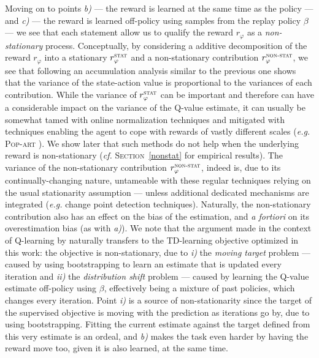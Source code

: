 Moving on to points \textit{b)}
--- the reward is learned at the same time as the policy ---
and \textit{c)}
--- the reward is learned off-policy using samples from the replay policy $\beta$ ---
we see that each statement allow us to qualify the reward $r_\varphi$ as
a \emph{non-stationary} process.
Conceptually, by considering a additive decomposition of the reward $r_\varphi$
into a stationary $r_\varphi^\textsc{stat}$
and a non-stationary contribution $r_\varphi^\textsc{non-stat}$,
we see that following an accumulation analysis similar to the previous one
shows that the variance of the state-action value is proportional to
the variances of each contribution.
While the variance of $r_\varphi^\textsc{stat}$ can be important and therefore can
have a considerable impact on the variance of the Q-value estimate,
it can usually be somewhat tamed with online normalization techniques and mitigated with
techniques enabling the agent to cope with rewards of vastly different scales
(\textit{e.g.} \textsc{Pop-art} \cite{Van_Hasselt2016-bh}).
We show later that such methods do not help when the underlying reward is non-stationary
(\textit{cf.} \textsc{Section}~\ref{nonstat} for empirical results).
The variance of the non-stationary contribution $r_\varphi^\textsc{non-stat}$,
indeed is, due to its continually-changing nature, untameable with these regular techniques
relying on the usual stationarity assumption ---
unless additional dedicated mechanisms are integrated
(\textit{e.g.} change point detection techniques).
Naturally, the non-stationary contribution also has an effect on the bias of the
estimation, and \textit{a fortiori} on its overestimation bias
(as with \textit{a)}).
We note that the argument made in the context of Q-learning by \cite{Fu2019-kb}
naturally transfers to the TD-learning objective optimized in this work:
the objective is non-stationary, due to
\textit{i)} the \emph{moving target} problem
--- caused by using bootstrapping to learn an estimate that is updated every iteration
and \textit{ii)} the \emph{distribution shift} problem
--- caused by learning the Q-value estimate off-policy using $\beta$,
effectively being a mixture of past policies,
which changes every iteration.
Point \textit{i)} is a source of non-stationarity since the target of the supervised
objective is moving with the prediction as iterations go by,
due to using bootstrapping.
Fitting the current estimate against the target defined from this very estimate is an ordeal,
and \textit{b)} makes the task even harder by having the reward move too,
given it is also learned, at the same time.
